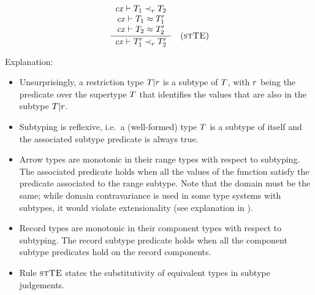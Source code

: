 

\[
\frac{\begin{array}{c}\mathit{cx}\vdash T_1\prec_{r}T_2\\\mathit{cx}\vdash T_1\approx T_1'\\\mathit{cx}\vdash T_2\approx T_2'\end{array}}{\mathit{cx}\vdash T_1'\prec_{r}T_2'}\quad\mbox{(\textsc{stTE})}
\]

Explanation:
\begin{itemize}
\item
Unsurprisingly, a restriction type $T|r$ is a subtype of $T$, with
$r$ being the predicate over the supertype $T$ that identifies the
values that are also in the subtype $T|r$.
\item
Subtyping is reflexive, i.e.\ a (well-formed) type $T$ is a subtype of
itself and the associated subtype predicate is always true.
\item
Arrow types are monotonic in their range types with respect to subtyping. The
associated predicate holds when all the values of the function satisfy the
predicate associated to the range subtype. Note that the domain must be the
same; while domain contravariance is used in some type systems with subtypes,
it would violate extensionality (see explanation in \cite{pvs-seman}).
\item
Record types are monotonic in their component types with respect to
subtyping. The record subtype predicate holds when all the component subtype
predicates hold on the record components.
\item
Rule $\textsc{stTE}$ states the substitutivity of equivalent types in subtype
judgements.
\end{itemize}


